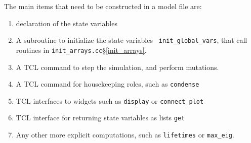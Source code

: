 The main items that need to be constructed in a model file are:
\begin{enumerate}
\item declaration of the state variables
\item A subroutine to initialize the state variables {\tt
    init\_global\_vars}, that call routines in {\tt init\_arrays.cc}\S\ref{init_arrays}.
\item A TCL command to step the simulation, and perform mutations.
\item A TCL command for housekeeping roles, such as {\tt condense}
\item TCL interfaces to widgets such as {\tt display} or {\tt connect\_plot}
\item TCL interface for returning state variables as lists {\tt get}
\item Any other more explicit computations, such as {\tt lifetimes}
  or {\tt max\_eig}.
\end{enumerate}

